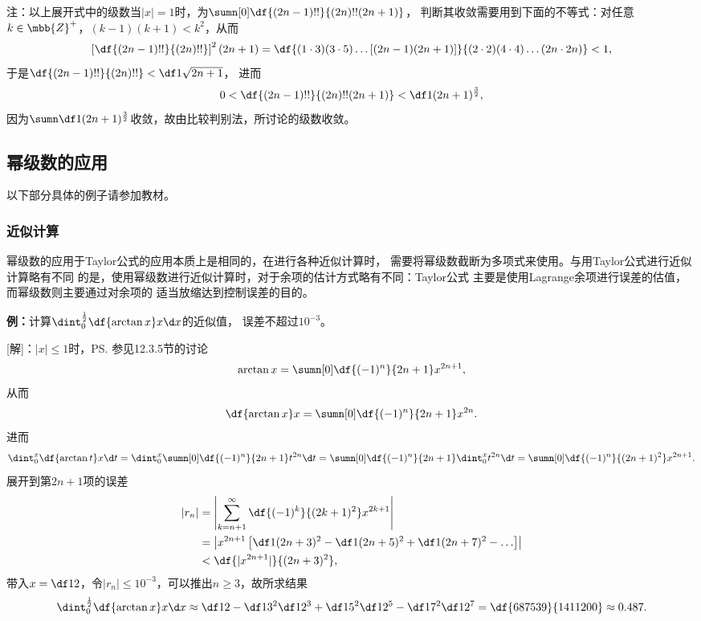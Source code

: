 注：以上展开式中的级数当$|x|=1$时，为$\sumn[0]\df{(2n-1)!!}{(2n)!!(2n+1)}$，
判断其收敛需要用到下面的不等式：对任意$k\in\mbb{Z}^+$，$(k-1)(k+1)<k^2$，从而
$$
	\left[\df{(2n-1)!!}{(2n)!!}\right]^2(2n+1)
	=\df{(1\cdot3)(3\cdot5)\ldots[(2n-1)(2n+1)]}
	{(2\cdot2)(4\cdot4)\ldots(2n\cdot2n)}<1,
$$
于是$\df{(2n-1)!!}{(2n)!!}<\df1{\sqrt{2n+1}}$，
进而
$$0<\df{(2n-1)!!}{(2n)!!(2n+1)}<\df1{(2n+1)^{\frac32}},$$
因为$\sumn\df1{(2n+1)^{\frac32}}$收敛，故由比较判别法，所讨论的级数收敛。

\subsection{幂级数的应用}

以下部分具体的例子请参加教材。

\subsubsection{近似计算}

幂级数的应用于Taylor公式的应用本质上是相同的，在进行各种近似计算时，
需要将幂级数截断为多项式来使用。与用Taylor公式进行近似计算略有不同
的是，使用幂级数进行近似计算时，对于余项的估计方式略有不同：Taylor公式
主要是使用Lagrange余项进行误差的估值，而幂级数则主要通过对余项的
适当放缩达到控制误差的目的。

{\bf 例：}计算$\dint_0^{\frac12}\df{\arctan x}x\d x$的近似值，
误差不超过$10^{-3}$。

[解]：$|x|\leq 1$时，\ps{参见12.3.5节的讨论}
$$\arctan x=\sumn[0]\df{(-1)^n}{2n+1}x^{2n+1},$$
从而
$$\df{\arctan x}x=\sumn[0]\df{(-1)^n}{2n+1}x^{2n}.$$
进而
$$\dint_0^x\df{\arctan t}x\d t
=\dint_0^x\sumn[0]\df{(-1)^n}{2n+1}t^{2n}\d t
=\sumn[0]\df{(-1)^n}{2n+1}\dint_0^xt^{2n}\d t
=\sumn[0]\df{(-1)^n}{(2n+1)^2}x^{2n+1}.$$
展开到第$2n+1$项的误差
\begin{align*}
	|r_n|
	&=\left|\sum\limits_{k=n+1}^{\infty}
	\df{(-1)^k}{(2k+1)^2}x^{2k+1}\right|\\
	&=\left|x^{2n+1}\left[\df1{(2n+3)^2}
	-\df1{(2n+5)^2}+\df1{(2n+7)^2}-\ldots\right]\right|\\
	&<\df{|x^{2n+1}|}{(2n+3)^2},
\end{align*}
带入$x=\df12$，令$|r_n|\leq 10^{-3}$，可以推出$n\geq 3$，故所求结果
$$\dint_0^{\frac12}\df{\arctan x}x\d x
\approx \df12-\df1{3^2}\df1{2^3}+\df1{5^2}\df1{2^5}-\df1{7^2}\df1{2^7}
=\df{687539}{1411200}\approx 0.487.$$
\fin 

